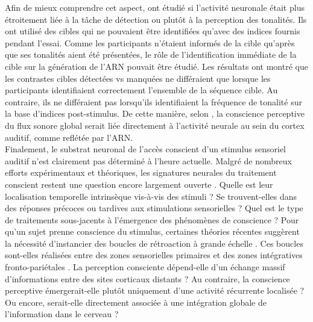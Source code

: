Afin de mieux comprendre cet aspect, \cite{gartner2021auditory} ont étudié si l'activité neuronale était plus étroitement liée à la tâche de détection ou plutôt à la perception des tonalités. 
Ils ont utilisé des cibles qui ne pouvaient être identifiées qu'avec des indices fournis pendant l'essai. 
Comme les participants n'étaient informés de la cible qu'après que ses tonalités aient été présentées, le rôle de l'identification immédiate de la cible sur la génération de l'ARN pouvait être étudié. 
Les résultats ont montré que les contrastes cibles détectées vs manquées ne différaient que lorsque les participants identifiaient correctement l'ensemble de la séquence cible. 
Au contraire, ils ne différaient pas lorsqu'ils identifiaient la fréquence de tonalité sur la base d'indices post-stimulus. 
De cette manière, selon \cite{gartner2021auditory}, la conscience perceptive du flux sonore global serait liée directement à l'activité neurale au sein du cortex auditif, comme reflétée par l'ARN. \\

Finalement, le substrat neuronal de l'accès conscient d'un stimulus sensoriel auditif n'est clairement pas déterminé à l'heure actuelle. 
Malgré de nombreux efforts expérimentaux et théoriques, les signatures neurales du traitement conscient restent une question encore largement ouverte \citep{sitt2014large}. 
Quelle est leur localisation temporelle intrinsèque vis-à-vis des stimuli ?
Se trouvent-elles dans des réponses précoces \citep{koivisto2006independence, melloni2007synchronization} ou tardives \citep{gaillard2009converging, sergent2005timing} aux stimulations sensorielles ? 
Quel est le type de traitements sous-jacents à l'émergence des phénomènes de conscience ? 
Pour qu'un sujet prenne conscience du stimulus, certaines théories récentes suggèrent la nécessité d'instancier des boucles de rétroaction à grande échelle \citep{del2007brain, del2009causal, libedinsky2011role}. 
Ces boucles sont-elles réalisées entre des zones sensorielles primaires et des zones intégratives fronto-pariétales \citep{eriksson2007similar, eriksson2017activity, giani2015detecting}. 
La perception consciente dépend-elle d'un échange massif d'informations entre des sites corticaux distants \citep{gaillard2009converging, lumer1999covariation} ?
Au contraire, la conscience perceptive émergerait-elle plutôt uniquement d'une activité récurrente localisée \citep{lamme2000distinct, lamme2003visual, lamme2006towards, pins2003neural} ? 
Ou encore, serait-elle directement associée à une intégration globale de l'information dans le cerveau \citep{tononi2008consciousness} ? 

